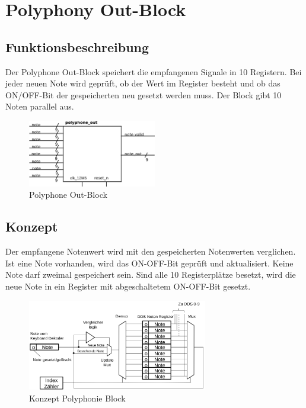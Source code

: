\section{Polyphony Out-Block}\label{sect.polyphonie_umsetzung}
 
\subsection{Funktionsbeschreibung}

Der Polyphone Out-Block speichert die empfangenen Signale in 10 Registern. Bei jeder neuen Note wird geprüft, ob der Wert im Register besteht und ob das ON/OFF-Bit der gespeicherten neu gesetzt werden muss. Der Block gibt 10 Noten parallel aus.

\begin{figure}[H]
	\includegraphics[width=0.5\textwidth]{images/midi_interface/polyphonie_blockschaltbild.png}
	\caption{Polyphone Out-Block}
	\label{fig.polyphnie_out_block}
\end{figure}

\subsection{Konzept}\label{konzept_plyphonie}

Der empfangene Notenwert wird mit den gespeicherten Notenwerten verglichen. Ist eine Note vorhanden, wird das ON-OFF-Bit geprüft und aktualisiert. Keine Note darf zweimal gespeichert sein. Sind alle 10 Registerplätze besetzt, wird die neue Note in ein Register mit abgeschaltetem ON-OFF-Bit gesetzt.

\begin{figure}[H]
	\includegraphics[width=0.7\textwidth]{images/midi_interface/Konzept_Hans_polyphonie.png}
	\caption{Konzept Polyphonie Block \citep{konzept_poly} }
	\label{fig.polyphnie_konzept}
\end{figure}

